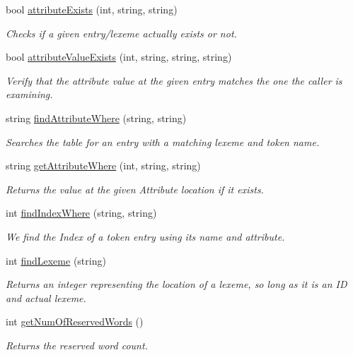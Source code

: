 \begin{DoxyCompactItemize}
bool \hyperlink{classSymbolTable_af93b3c97308b5cfe7661e57b83d8dc35}{attributeExists} (int, string, string)
\begin{DoxyCompactList}\small\item\em Checks if a given entry/lexeme actually exists or not. \end{DoxyCompactList}\item 
bool \hyperlink{classSymbolTable_a7df0fef90bee097810b553ad2e1c6cec}{attributeValueExists} (int, string, string, string)
\begin{DoxyCompactList}\small\item\em Verify that the attribute value at the given entry matches the one the caller is examining. \end{DoxyCompactList}\item 
string \hyperlink{classSymbolTable_a0b0bdb5b1a6095782c6c4f318737a0a9}{findAttributeWhere} (string, string)
\begin{DoxyCompactList}\small\item\em Searches the table for an entry with a matching lexeme and token name. \end{DoxyCompactList}\item 
string \hyperlink{classSymbolTable_aa5e55d23f3b69e48a8e6c385bd9d509f}{getAttributeWhere} (int, string, string)
\begin{DoxyCompactList}\small\item\em Returns the value at the given Attribute location if it exists. \end{DoxyCompactList}\item 
int \hyperlink{classSymbolTable_a61a3da421ef79fffe47e8e2d3065bb05}{findIndexWhere} (string, string)
\begin{DoxyCompactList}\small\item\em We find the Index of a token entry using its name and attribute. \end{DoxyCompactList}\item 
int \hyperlink{classSymbolTable_a33fa9fe363246a0b54e9f58191ad931e}{findLexeme} (string)
\begin{DoxyCompactList}\small\item\em Returns an integer representing the location of a lexeme, so long as it is an ID and actual lexeme. \end{DoxyCompactList}\item 
int \hyperlink{classSymbolTable_a218f832e3d8b4d37cb3aee7af732a0c6}{getNumOfReservedWords} ()
\begin{DoxyCompactList}\small\item\em Returns the reserved word count. \end{DoxyCompactList}\end{DoxyCompactItemize}
